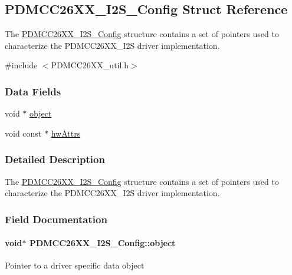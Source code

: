 \subsection{P\+D\+M\+C\+C26\+X\+X\+\_\+\+I2\+S\+\_\+\+Config Struct Reference}
\label{struct_p_d_m_c_c26_x_x___i2_s___config}


The \hyperlink{struct_p_d_m_c_c26_x_x___i2_s___config}{P\+D\+M\+C\+C26\+X\+X\+\_\+\+I2\+S\+\_\+\+Config} structure contains a set of pointers used to characterize the P\+D\+M\+C\+C26\+X\+X\+\_\+\+I2\+S driver implementation.  




{\ttfamily \#include $<$P\+D\+M\+C\+C26\+X\+X\+\_\+util.\+h$>$}

\subsubsection*{Data Fields}
\begin{DoxyCompactItemize}
\item 
void $\ast$ \hyperlink{struct_p_d_m_c_c26_x_x___i2_s___config_a3016fb0e8abf231ef6e34e468e459b50}{object}
\item 
void const $\ast$ \hyperlink{struct_p_d_m_c_c26_x_x___i2_s___config_a45d9141418dd765f894371694b878819}{hw\+Attrs}
\end{DoxyCompactItemize}


\subsubsection{Detailed Description}
The \hyperlink{struct_p_d_m_c_c26_x_x___i2_s___config}{P\+D\+M\+C\+C26\+X\+X\+\_\+\+I2\+S\+\_\+\+Config} structure contains a set of pointers used to characterize the P\+D\+M\+C\+C26\+X\+X\+\_\+\+I2\+S driver implementation. 

\subsubsection{Field Documentation}
\paragraph[{object}]{\setlength{\rightskip}{0pt plus 5cm}void$\ast$ P\+D\+M\+C\+C26\+X\+X\+\_\+\+I2\+S\+\_\+\+Config\+::object}\label{struct_p_d_m_c_c26_x_x___i2_s___config_a3016fb0e8abf231ef6e34e468e459b50}
Pointer to a driver specific data object 
